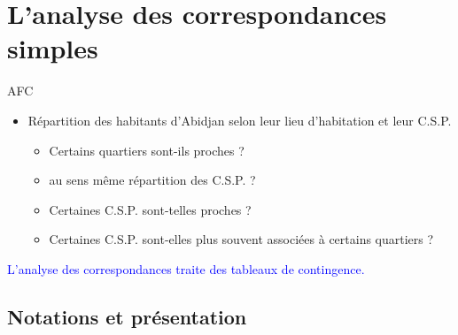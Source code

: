 \documentclass[11pt]{beamer}
\begin{document}
\section{L’analyse des correspondances simples}
\begin{frame}{AFC}

\begin{itemize}
\item  Répartition des habitants d'Abidjan selon leur lieu
d’habitation  et leur C.S.P.

\begin{itemize}
\item Certains quartiers sont-ils proches ?
\item  au sens même répartition des C.S.P. ?
\item Certaines C.S.P. sont-telles proches ?
\item Certaines C.S.P. sont-elles plus souvent associées à
certains quartiers ?
\end{itemize}
\end{itemize}

\textcolor{blue}{L’analyse des correspondances traite des tableaux de contingence.}
\end{frame}
\subsection{Notations et présentation}
\end{document}
